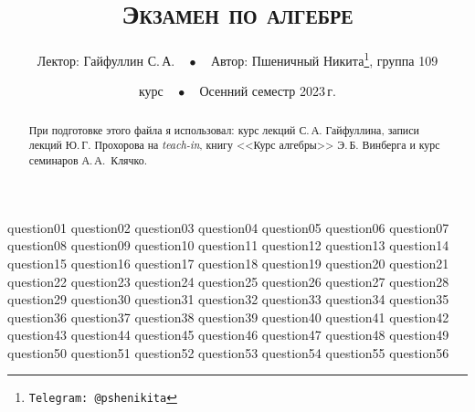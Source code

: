 \documentclass[a4paper, 10pt]{article}
\begin{document}
\title{\bfseries\scshape Экзамен по алгебре}
\author{Лектор: Гайфуллин С.\,А.$\quad\bullet\quad$Автор: Пшеничный Никита\thanks{\texttt{Telegram: @pshenikita}}, группа 109}
\date{ курс$\quad\bullet\quad$Осенний семестр 2023\,г.}

\maketitle

\begin{abstract}
    При подготовке этого файла я использовал: курс лекций С.\,А. Гайфуллина, записи лекций Ю.\,Г. Прохорова на \textit{teach-in}, книгу <<Курс алгебры>> Э.\,Б. Винберга и курс семинаров \mbox{А.\,А. Клячко}.
\end{abstract}

\tableofcontents

{question01}
{question02}
{question03}
{question04}
{question05}
{question06}
{question07}
{question08}
{question09}
{question10}
{question11}
{question12}
{question13}
{question14}
{question15}
{question16}
{question17}
{question18}
{question19}
{question20}
{question21}
{question22}
{question23}
{question24}
{question25}
{question26}
{question27}
{question28}
{question29}
{question30}
{question31}
{question32}
{question33}
{question34}
{question35}
{question36}
{question37}
{question38}
{question39}
{question40}
{question41}
{question42}
{question43}
{question44}
{question45}
{question46}
{question47}
{question48}
{question49}
{question50}
{question51}
{question52}
{question53}
{question54}
{question55}
{question56}
\end{document}

